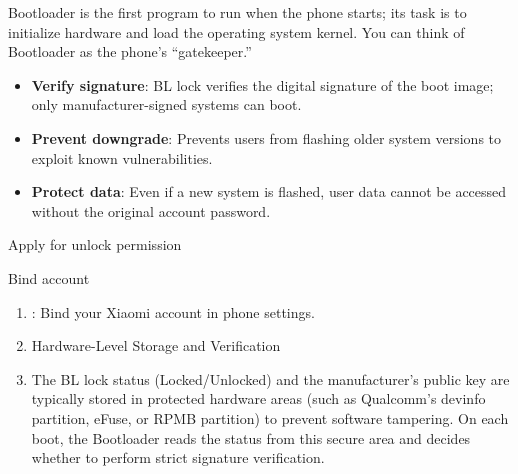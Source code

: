 


Bootloader is the first program to run when the phone starts; its task is to initialize hardware and load the operating system kernel. You can think of Bootloader as the phone's “gatekeeper.”


\begin{itemize}
  \item \textbf{Verify signature}: BL lock verifies the digital signature of the boot image; only manufacturer-signed systems can boot.
  \item \textbf{Prevent downgrade}: Prevents users from flashing older system versions to exploit known vulnerabilities.
  \item \textbf{Protect data}: Even if a new system is flashed, user data cannot be accessed without the original account password.
\end{itemize}


Apply for unlock permission


Bind account

\begin{enumerate}
  \item : Bind your Xiaomi account in phone settings.
  \item Hardware-Level Storage and Verification
  \item The BL lock status (Locked/Unlocked) and the manufacturer's public key are typically stored in protected hardware areas (such as Qualcomm's devinfo partition, eFuse, or RPMB partition) to prevent software tampering. On each boot, the Bootloader reads the status from this secure area and decides whether to perform strict signature verification.
\end{enumerate}


